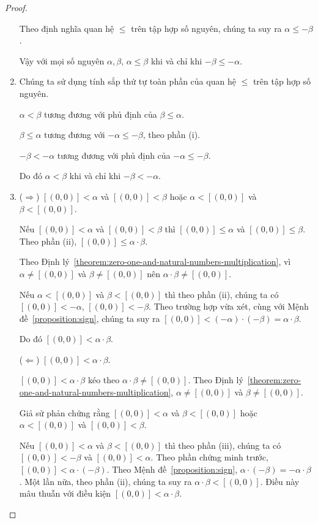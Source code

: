 \begin{proof}
\begin{enumerate}[label={(\roman*)}]
              Theo định nghĩa quan hệ $\leq$ trên tập hợp số nguyên, chúng ta suy ra $\alpha\leq -\beta$.

              Vậy với mọi số nguyên $\alpha, \beta$, $\alpha\leq \beta$ khi và chỉ khi $-\beta\leq-\alpha$.
        \item Chúng ta sử dụng tính sắp thứ tự toàn phần của quan hệ $\leq$ trên tập hợp số nguyên.

              $\alpha < \beta$ tương đương với phủ định của $\beta\leq\alpha$.

              $\beta\leq\alpha$ tương đương với $-\alpha\leq-\beta$, theo phần (i).

              $-\beta < -\alpha$ tương đương với phủ định của $-\alpha\leq-\beta$.

              Do đó $\alpha < \beta$ khi và chỉ khi $-\beta < -\alpha$.
        \item ($\Rightarrow$) $[(0,0)] < \alpha$ và $[(0,0)] < \beta$ hoặc $\alpha < [(0,0)]$ và $\beta < [(0,0)]$.

              Nếu $[(0,0)] < \alpha$ và $[(0,0)] < \beta$ thì $[(0,0)]\leq \alpha$ và $[(0,0)]\leq \beta$. Theo phần (ii), $[(0,0)] \leq \alpha\cdot\beta$.

              Theo Định lý~\ref{theorem:zero-one-and-natural-numbers-multiplication}, vì $\alpha\ne [(0,0)]$ và $\beta\ne[(0,0)]$ nên $\alpha\cdot\beta \ne [(0,0)]$.

              Nếu $\alpha < [(0,0)]$ và $\beta < [(0,0)]$ thì theo phần (ii), chúng ta có $[(0,0)] < -\alpha$, $[(0,0)] < -\beta$. Theo trường hợp vừa xét, cùng với Mệnh đề~\ref{proposition:sign}, chúng ta suy ra $[(0, 0)] < (-\alpha)\cdot(-\beta) = \alpha\cdot\beta$.

              Do đó $[(0,0)] < \alpha\cdot\beta$.

              ($\Leftarrow$) $[(0,0)] < \alpha\cdot\beta$.

              $[(0,0)] < \alpha\cdot\beta$ kéo theo $\alpha\cdot\beta \ne [(0,0)]$. Theo Định lý~\ref{theorem:zero-one-and-natural-numbers-multiplication}, $\alpha\ne [(0,0)]$ và $\beta\ne [(0,0)]$.

              Giả sử phản chứng rằng $[(0,0)] < \alpha$ và $\beta < [(0,0)]$ hoặc $\alpha < [(0,0)]$ và $[(0,0)] < \beta$.

              Nếu $[(0,0)] < \alpha$ và $\beta < [(0,0)]$ thì theo phần (iii), chúng ta có $[(0,0)] < -\beta$ và $[(0,0)] < \alpha$. Theo phần chứng minh trước, $[(0,0)] < \alpha\cdot(-\beta)$. Theo Mệnh đề~\ref{proposition:sign}, $\alpha\cdot(-\beta) = -\alpha\cdot\beta$. Một lần nữa, theo phần (ii), chúng ta suy ra $\alpha\cdot\beta < [(0,0)]$. Điều này mâu thuẫn với điều kiện $[(0,0)] < \alpha\cdot\beta$.


\end{enumerate}
\end{proof}
